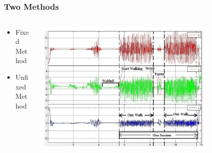 \documentclass{beamer}
\begin{document}
\subsection{}
\begin{frame}
  \frametitle{Two Methods}
  \begin{columns}
  \begin{column}{0.4\textwidth}
  \begin{itemize}
    \item Fixed Method
  	\linebreak
  	\item Unfixed Method
  \end{itemize}
  \end{column}
  \begin{column}{0.8\textwidth}
   \includegraphics[width=0.8\textwidth]{Illustrations/gaitpatterns.png}
       \\
  \end{column}
  \end{columns}
\end{frame}
\end{document}
